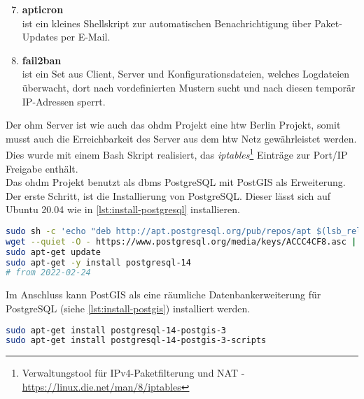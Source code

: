 \begin{enumerate}[label=\textbf{\arabic*.}]\setcounter{enumi}{6}
	\item \textbf{apticron}\\ist ein kleines Shellskript zur automatischen Benachrichtigung über Paket-Updates per E-Mail.
	\item \textbf{fail2ban} \\ist ein Set aus Client, Server und Konfigurationsdateien, welches Logdateien überwacht, dort nach vordefinierten Mustern sucht und nach diesen temporär IP-Adressen sperrt.
\end{enumerate}

Der \gls{ohm} Server ist wie auch das \gls{ohdm} Projekt eine \gls{htw} Berlin Projekt, somit musst auch die Erreichbarkeit des Server aus dem \gls{htw} Netz gewährleistet werden. Dies wurde mit einem Bash Skript realisiert, das \textit{iptables}\footnote{Verwaltungstool für IPv4-Paketfilterung und NAT - \url{https://linux.die.net/man/8/iptables}} Einträge zur Port/IP Freigabe enthält.\\

Das \gls{ohdm} Projekt benutzt als \gls{dbms} PostgreSQL mit PostGIS\cite{postgis:manual} als Erweiterung.\\
Der erste Schritt, ist die Installierung von PostgreSQL. Dieser lässt sich auf Ubuntu 20.04 wie in \autoref{lst:install-postgresql} installieren.
\begin{lstlisting}[language=bash,caption={Installation PostgreSQL},label={lst:install-postgresql}]
sudo sh -c 'echo "deb http://apt.postgresql.org/pub/repos/apt $(lsb_release -cs)-pgdg main" > /etc/apt/sources.list.d/pgdg.list'
wget --quiet -O - https://www.postgresql.org/media/keys/ACCC4CF8.asc | sudo apt-key add -
sudo apt-get update
sudo apt-get -y install postgresql-14
# from 2022-02-24
\end{lstlisting}
Im Anschluss kann PostGIS\cite{postgis:manual} als eine räumliche Datenbankerweiterung für PostgreSQL (siehe \autoref{lst:install-postgis}) installiert werden.
\begin{lstlisting}[language=bash,caption={Installation PostGIS},label={lst:install-postgis}]
sudo apt-get install postgresql-14-postgis-3
sudo apt-get install postgresql-14-postgis-3-scripts
\end{lstlisting}

